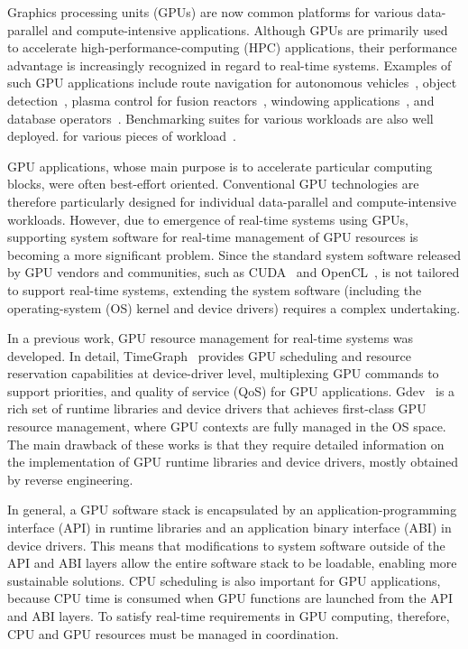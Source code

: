 Graphics processing units (GPUs) are now common platforms for various data-parallel and compute-intensive applications. Although GPUs are primarily used to accelerate high-performance-computing (HPC) applications, their performance advantage is increasingly recognized in regard to real-time systems. Examples of such GPU applications include route navigation for autonomous vehicles~\cite{cmu:routing}, object detection~\cite{hirabayashi:cpsna2013}, plasma control for fusion reactors~\cite{tokamak}, windowing applications~\cite{kato:rtas2011}, and database operators~\cite{bakkum:sql}. Benchmarking suites for various workloads are also well deployed. for various pieces of workload~\cite{rodinia}.

GPU applications, whose main purpose is to accelerate particular computing blocks, were often best-effort oriented. Conventional GPU technologies are therefore particularly designed for individual data-parallel and compute-intensive workloads. However, due to emergence of real-time systems using GPUs, supporting system software for real-time management of GPU resources is becoming a more significant problem. Since the standard system software released by GPU vendors and communities, such as CUDA~\cite{nvidia:cuda_zone} and OpenCL~\cite{opencl}, is not tailored to support real-time systems, extending the system software (including the operating-system (OS) kernel and device drivers) requires a complex undertaking.

In a previous work, GPU resource management for real-time systems was developed. In detail, TimeGraph~\cite{kato:timegraph} provides GPU scheduling and resource reservation capabilities at device-driver level, multiplexing GPU commands to support priorities, and quality of service (QoS) for GPU applications. Gdev~\cite{kato:gdev} is a rich set of runtime libraries and device drivers that achieves first-class GPU resource management, where GPU contexts are fully managed in the OS space. The main drawback of these works is that they require detailed information on the implementation of GPU runtime libraries and device drivers, mostly obtained by reverse engineering.

In general, a GPU software stack is encapsulated by an application-programming interface (API) in runtime libraries and an application binary interface (ABI) in device drivers. This means that modifications to system software outside of the API and ABI layers allow the entire software stack to be loadable, enabling more sustainable solutions. CPU scheduling is also important for GPU applications, because CPU time is consumed when GPU functions are launched from the API and ABI layers. To satisfy real-time requirements in GPU computing, therefore, CPU and GPU resources must be managed in coordination.

